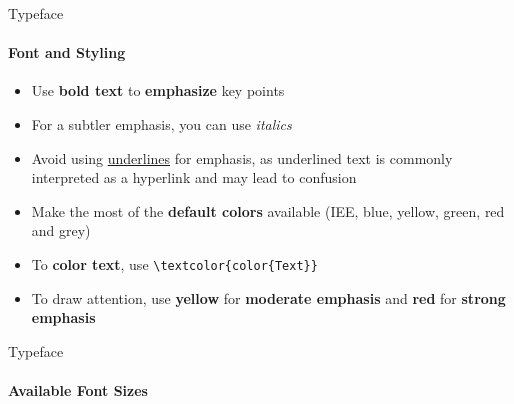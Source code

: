 \documentclass[aspectratio=169]{beamer}
\begin{document}
\begin{frame}{Typeface}
    \framesubtitle{Font and Styling}

    \begin{coloredblock}
        \begin{itemize}
            \item Use \textbf{bold text} to \textbf{emphasize} key points
            \item For a subtler emphasis, you can use \textit{italics}
            \item Avoid using \underline{underlines} for emphasis, as underlined text is commonly interpreted as a hyperlink and may lead to confusion
        \end{itemize}
    \end{coloredblock}

    \vspace{0.2cm}

    \begin{coloredblock}
            \begin{itemize}
                \item Make the most of the \textbf{default colors} available (IEE, blue, yellow, green, red and grey)
                \item To \textbf{color text}, use \texttt{\textbackslash textcolor\{color\{Text\}\}}
                \item To draw attention, use \textbf{yellow} for \textbf{moderate emphasis} and \textbf{red} for \textbf{strong emphasis}
            \end{itemize}
    \end{coloredblock}
    
\end{frame}

\begin{frame}{Typeface}
    \framesubtitle{Available Font Sizes}
    \vfill
    \begin{columns}
        \centering
        \thefontsize[TINY]\TINY
        \thefontsize[Tiny]\Tiny
        \thefontsize[myFootnotesize]\myFootnotesize
        \thefontsize[tiny]\tiny
        \thefontsize[scriptsize]\scriptsize
        \thefontsize[footnotesize]\footnotesize
        \thefontsize[small]\small
        \thefontsize[normalsize]\normalsize
        \thefontsize[large]\large
    
        \centering
        \thefontsize[Large]\Large
        \thefontsize[LARGE]\LARGE
        \thefontsize[huge]\huge
        \thefontsize[Huge]\Huge
    \end{columns}
    \vfill
\end{frame}
\end{document}
